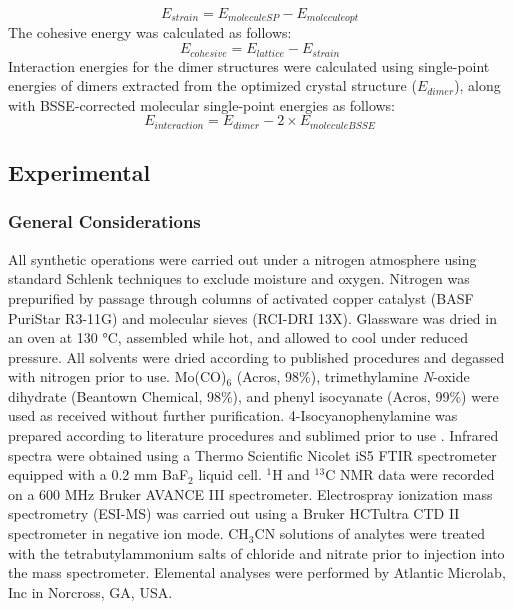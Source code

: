 \begin{equation}\label{estrain}
    E_{strain} = E_{moleculeSP} - E_{moleculeopt}
\end{equation}
The cohesive energy was calculated as follows:
\begin{equation}\label{ecohesive}
    E_{cohesive} = E_{lattice} - E_{strain}
\end{equation}
Interaction energies for the dimer structures were calculated using single-point energies of dimers extracted from the optimized crystal structure ($E_{dimer}$), along with BSSE-corrected molecular single-point energies as follows:
\begin{equation}\label{einteraction}
    E_{interaction} = E_{dimer} - 2 \times E_{moleculeBSSE}	
\end{equation}

\subsection{Experimental}
\subsubsection{General Considerations}
All synthetic operations were carried out under a nitrogen atmosphere using standard Schlenk techniques to exclude moisture and oxygen. Nitrogen was prepurified by passage through columns of activated copper catalyst (BASF PuriStar R3-11G) and molecular sieves (RCI-DRI 13X). Glassware was dried in an oven at 130 °C, assembled while hot, and allowed to cool under reduced pressure. All solvents were dried according to published procedures and degassed with nitrogen prior to use. Mo(CO)$_{6}$ (Acros, 98\%), trimethylamine \textit{N}-oxide dihydrate (Beantown Chemical, 98\%), and phenyl isocyanate (Acros, 99\%) were used as received without further purification. 4-Isocyanophenylamine was prepared according to literature procedures and sublimed prior to use \cite{Heinze2003}. Infrared spectra were obtained using a Thermo Scientific Nicolet iS5 FTIR spectrometer equipped with a 0.2 mm BaF$_{2}$ liquid cell. $^{1}$H and $^{13}$C NMR data were recorded on a 600 MHz Bruker AVANCE III spectrometer. Electrospray ionization mass spectrometry (ESI-MS) was carried out using a Bruker HCTultra CTD II spectrometer in negative ion mode. CH$_{3}$CN solutions of analytes were treated with the tetrabutylammonium salts of chloride and nitrate prior to injection into the mass spectrometer. Elemental analyses were performed by Atlantic Microlab, Inc in Norcross, GA, USA.

